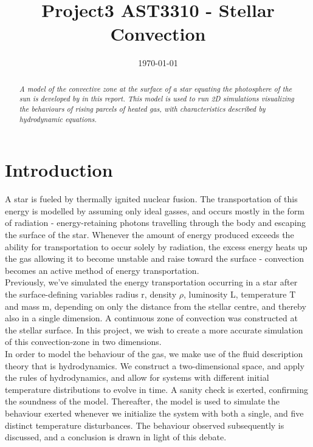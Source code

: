 \documentclass[10pt, nofootinbib, twocolumn]{revtex4-1}
\begin{document}
\title{Project3 AST3310 - Stellar Convection} 
\date{\today}        
\begin{abstract}
    \textit{A model of the convective zone at the surface of a star equating the photosphere of the sun is developed by in this report. This model is used to run 2D simulations visualizing the behaviours of rising parcels of heated gas, with characteristics described by hydrodynamic equations.}
\end{abstract}
\maketitle       

\section{Introduction}\label{sec:introduction}
A star is fueled by thermally ignited nuclear fusion. The transportation of this energy is modelled by assuming only ideal gasses, and occurs mostly in the form of radiation - energy-retaining photons travelling through the body and escaping the surface of the star. Whenever the amount of energy produced exceeds the ability for transportation to occur solely by radiation, the excess energy heats up the gas allowing it to become unstable and raise toward the surface - convection becomes an active method of energy transportation. \\

Previously, we've simulated the energy transportation occurring in a star after the surface-defining variables radius r, density $\rho$, luminosity L, temperature T and mass m, depending on only the distance from the stellar centre, and thereby also in a single dimension. A continuous zone of convection was constructed at the stellar surface. In this project, we wish to create a more accurate simulation of this convection-zone in two dimensions. \\

In order to model the behaviour of the gas, we make use of the fluid description theory that is hydrodynamics. We construct a two-dimensional space, and apply the rules of hydrodynamics, and allow for systems with different initial temperature distributions to evolve in time. A sanity check is exerted, confirming the soundness of the model. Thereafter, the model is used to simulate the behaviour exerted whenever we initialize the system with both a single, and five distinct temperature disturbances. The behaviour observed subsequently is discussed, and a conclusion is drawn in light of this debate.
\end{document}
